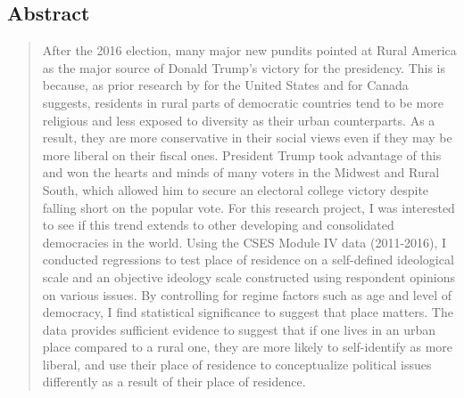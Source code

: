 \documentclass[12pt, titlepage]{article}
\title{\tb{Place of Residence and Political Attitudes in Democracies Worldwide }}
\author{Jennifer Lin}
\affil{New College of Florida}
\begin{document}
\begin{singlespace}
\maketitle
\end{singlespace}

\begin{center} %
\section*{Abstract} %
	
\begin{quote}
After the 2016 election, many major new pundits pointed at Rural America as the major source of Donald Trump’s victory for the presidency. This is because, as prior research by \cite{walsh_putting_2012} for the United States and \cite{walks_city-suburban_2005} for Canada suggests, residents in rural parts of democratic countries tend to be more religious and less exposed to diversity as their urban counterparts. As a result, they are more conservative in their social views even if they may be more liberal on their fiscal ones. President Trump took advantage of this and won the hearts and minds of many voters in the Midwest and Rural South, which allowed him to secure an electoral college victory despite falling short on the popular vote. For this research project, I was interested to see if this trend extends to other developing and consolidated democracies in the world. Using the CSES Module IV data (2011-2016), I conducted regressions to test place of residence on a self-defined ideological scale and an objective ideology scale constructed using respondent opinions on various issues. By controlling for regime factors such as age and level of democracy, I find statistical significance to suggest that place matters. The data provides sufficient evidence to suggest that if one lives in an urban place compared to a rural one, they are more likely to self-identify as more liberal, and use their place of residence to conceptualize political issues differently as a result of their place of residence.

\end{quote}
\end{center}

\clearpage

\tableofcontents
\clearpage
\end{document}
